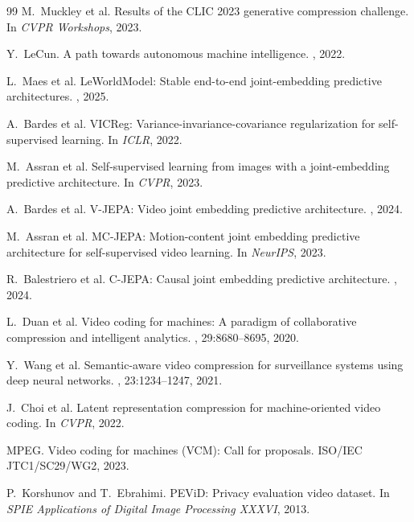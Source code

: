 \documentclass{article}
\begin{document}
\begin{thebibliography}{99}
M.~Muckley et al.
\newblock Results of the CLIC 2023 generative compression challenge.
\newblock In {\em CVPR Workshops}, 2023.

Y.~LeCun.
\newblock A path towards autonomous machine intelligence.
, 2022.

L.~Maes et al.
\newblock LeWorldModel: Stable end-to-end joint-embedding predictive architectures.
, 2025.

A.~Bardes et al.
\newblock VICReg: Variance-invariance-covariance regularization for self-supervised learning.
\newblock In {\em ICLR}, 2022.

M.~Assran et al.
\newblock Self-supervised learning from images with a joint-embedding predictive architecture.
\newblock In {\em CVPR}, 2023.

A.~Bardes et al.
\newblock V-JEPA: Video joint embedding predictive architecture.
, 2024.

M.~Assran et al.
\newblock MC-JEPA: Motion-content joint embedding predictive architecture for self-supervised video learning.
\newblock In {\em NeurIPS}, 2023.

R.~Balestriero et al.
\newblock C-JEPA: Causal joint embedding predictive architecture.
, 2024.

L.~Duan et al.
\newblock Video coding for machines: A paradigm of collaborative compression and intelligent analytics.
, 29:8680--8695, 2020.

Y.~Wang et al.
\newblock Semantic-aware video compression for surveillance systems using deep neural networks.
, 23:1234--1247, 2021.

J.~Choi et al.
\newblock Latent representation compression for machine-oriented video coding.
\newblock In {\em CVPR}, 2022.

MPEG.
\newblock Video coding for machines (VCM): Call for proposals.
\newblock ISO/IEC JTC1/SC29/WG2, 2023.

P.~Korshunov and T.~Ebrahimi.
\newblock PEViD: Privacy evaluation video dataset.
\newblock In {\em SPIE Applications of Digital Image Processing XXXVI}, 2013.


\end{thebibliography}
\end{document}
